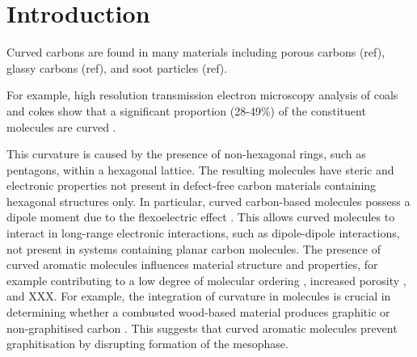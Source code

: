 %
\section{Introduction}
\label{sec:Introduction}

Curved carbons are found in many materials including porous carbons (ref), glassy carbons (ref), and soot particles (ref).

For example, high resolution transmission electron microscopy analysis of coals and cokes show that a significant proportion (28-49\%) of the constituent molecules are curved \cite{wang2017improved,zhong2018structural}. %


This curvature is caused by the presence of non-hexagonal rings, such as pentagons, within a hexagonal lattice. The resulting molecules have steric and electronic properties not present in defect-free carbon materials containing hexagonal structures only. In particular, curved carbon-based molecules possess a dipole moment due to the flexoelectric effect \cite{Martin2017}. This allows curved molecules to interact in long-range electronic interactions, such as dipole-dipole interactions, not present in systems containing planar carbon molecules.
The presence of curved aromatic molecules influences material structure and properties, for example contributing to a low degree of molecular ordering %
\cite{zhong2018structural}, increased porosity \cite{zhang2020molecular}, %
and XXX. For example, the integration of curvature in molecules is crucial in determining whether a combusted wood-based material produces graphitic or non-graphitised carbon \cite{abrahamson2018carbon}. This suggests that curved aromatic molecules prevent graphitisation by disrupting formation of the mesophase. %


